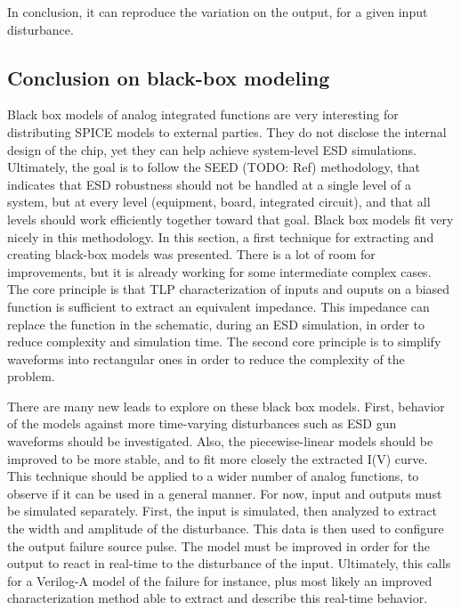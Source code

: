 
In conclusion, it can reproduce the variation on the output, for a given input disturbance.

\subsection{Conclusion on black-box modeling}

Black box models of analog integrated functions are very interesting for distributing SPICE models to external parties.
They do not disclose the internal design of the chip, yet they can help achieve system-level ESD simulations.
Ultimately, the goal is to follow the SEED (TODO: Ref) methodology, that indicates that ESD robustness should not be handled at a single level of a system, but at every level (equipment, board, integrated circuit), and that all levels should work efficiently together toward that goal.
Black box models fit very nicely in this methodology.
In this section, a first technique for extracting and creating black-box models was presented.
There is a lot of room for improvements, but it is already working for some intermediate complex cases.
The core principle is that TLP characterization of inputs and ouputs on a biased function is sufficient to extract an equivalent impedance.
This impedance can replace the function in the schematic, during an ESD simulation, in order to reduce complexity and simulation time.
The second core principle is to simplify waveforms into rectangular ones in order to reduce the complexity of the problem.

There are many new leads to explore on these black box models.
First, behavior of the models against more time-varying disturbances such as ESD gun waveforms should be investigated.
Also, the piecewise-linear models should be improved to be more stable, and to fit more closely the extracted I(V) curve.
This technique should be applied to a wider number of analog functions, to observe if it can be used in a general manner.
For now, input and outputs must be simulated separately.
First, the input is simulated, then analyzed to extract the width and amplitude of the disturbance.
This data is then used to configure the output failure source pulse.
The model must be improved in order for the output to react in real-time to the disturbance of the input.
Ultimately, this calls for a Verilog-A model of the failure for instance, plus most likely an improved characterization method able to extract and describe this real-time behavior.

